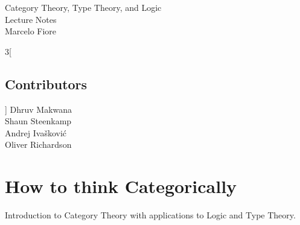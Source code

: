 \newcommand {\cat}{%
    \mathbf%
}
\newcommand {\domain}[1] {%
    \mathrm{dom}(#1)%
}
\newcommand {\codomain}[1] {%
    \mathrm{cod}(#1)%
}
\newcommand {\idarrow}[1][] {%
    \mathbf{1}{#1}%
}
\newcommand {\Cat}{%
    \cat {Cat}%
}
\newcommand {\Mon}{%
    \cat {Mon}%
}
\newcommand {\Poset}{%
    \cat {Poset}%
}
\newcommand {\Rel}{%
    \cat {Rel}%
}
\newcommand {\Sets}{%
    \cat {Sets}%
}
\newcommand {\Groups}{%
    \cat {Groups}%
}
\newcommand {\Graphs}{%
    \cat {Graphs}%
}

\newcommand{\ie}{\emph{i.e.}}
\newcommand{\etc}{\emph{etc.}}

\newcommand{\eqdef}{\stackrel{\text{def}}{=}} %
\newcommand{\comp}{\circ} %
\newcommand{\icomp}{\,} %

\newcommand{\setof}[1]{ \{ #1 \} }
\newcommand{\bigsetof}[1]{ \big\{ #1 \big\} }
\newcommand{\suchthat}{\mid}
\newcommand{\union}{\cup}

\newcommand{\nelem}[1]{ \mathbf{ #1 } }
\newcommand{\id}[1]{ \mathrm{id}_{ #1 } }
\newcommand{\nats}{\mathbb{N}}



\begin{center} {\LARGE \sc
Category Theory, Type Theory, and Logic\\
  Lecture Notes\\[4mm]}
  \Large Marcelo Fiore
\end{center}


\begin{multicols}{3}[\section*{Contributors}]
Dhruv Makwana\\ 
Shaun Steenkamp\\
Andrej Ivašković\\
Oliver Richardson
\end{multicols}
\clearpage


\tableofcontents

\newpage
\chapter{How to think Categorically}

Introduction to Category Theory with applications to Logic and Type Theory.

